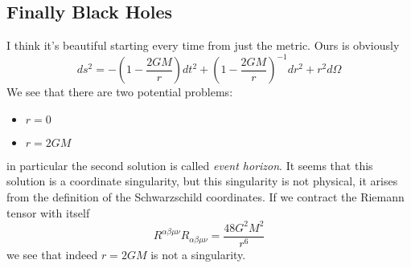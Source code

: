 \subsection{Finally Black Holes}

I think it's beautiful starting every time from just the metric. Ours is obviously
\[
ds^{2} = -  \left( 1- \frac{2GM}{r} \right)dt^{2} + \left( 1- \frac{2GM}{r} \right)^{-1} dr^{2} + r^{2}d\Omega 
\]
We see that there are two potential problems:
\begin{itemize}
\item $r = 0$
\item $r = 2GM$
\end{itemize}
in particular the second solution is called \emph{event horizon}. It seems that this solution is a coordinate singularity, but this singularity is not physical, it arises from the definition of the Schwarzschild coordinates.
If we contract the Riemann tensor with itself
\[
R^{\alpha \beta \mu \nu }R_{\alpha \beta \mu \nu } = \frac{48G^{2}M^{2}}{r^{6}}
\]
we see that indeed $r= 2GM$ is not a singularity.\par

